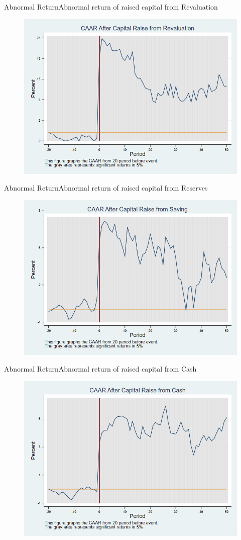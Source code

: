 \documentclass{beamer}
\begin{document}
\begin{frame}{Abnormal Return}{Abnormal return of raised capital from Revaluation}
	\label{car_marketmodelRevaluation}
	\begin{figure}
		\centering
		\includegraphics[width=0.65\linewidth]{Output/car_marketmodelRevaluation.png}
		\label{fig:car_marketmodelRevaluation}
	\end{figure}
\end{frame}


\begin{frame}{Abnormal Return}{Abnormal return of raised capital from Reserves}
	\label{car_marketmodelSaving}
	\begin{figure}
		\centering
		\includegraphics[width=0.65\linewidth]{Output/car_marketmodelSaving.png}
		\label{fig:car_marketmodelSaving}
	\end{figure}
\end{frame}


\begin{frame}{Abnormal Return}{Abnormal return of raised capital from Cash}
	\label{car_marketmodelCash}
	\begin{figure}
		\centering
		\includegraphics[width=0.65\linewidth]{Output/car_marketmodelCash.png}
		\label{fig:car_marketmodelCash}
	\end{figure}
	
\end{frame}
\end{document}
